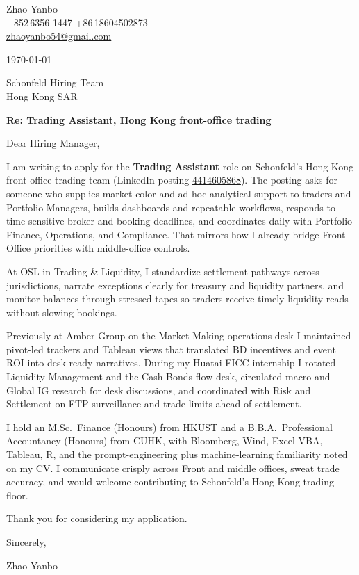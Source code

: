 \documentclass[10pt,a4paper]{article}
\begin{document}
\begin{flushleft}
  Zhao Yanbo\\
  +852\,6356-1447 \;\textbar\; +86\,18604502873\\
  \href{mailto:zhaoyanbo54@gmail.com}{zhaoyanbo54@gmail.com}
\end{flushleft}

\vspace{1em}

\begin{flushright}
  \today
\end{flushright}

\vspace{0.75em}

Schonfeld Hiring Team\\
Hong Kong SAR

\vspace{1em}

\textbf{Re: Trading Assistant, Hong Kong front-office trading}

\vspace{0.75em}

Dear Hiring Manager,

I am writing to apply for the \textbf{Trading Assistant} role on Schonfeld's Hong Kong front-office trading team (LinkedIn posting \href{https://www.linkedin.com/jobs/view/4414605868/}{4414605868}). The posting asks for someone who supplies market color and ad hoc analytical support to traders and Portfolio Managers, builds dashboards and repeatable workflows, responds to time-sensitive broker and booking deadlines, and coordinates daily with Portfolio Finance, Operations, and Compliance. That mirrors how I already bridge Front Office priorities with middle-office controls.

At OSL in Trading \& Liquidity, I standardize settlement pathways across jurisdictions, narrate exceptions clearly for treasury and liquidity partners, and monitor balances through stressed tapes so traders receive timely liquidity reads without slowing bookings.

Previously at Amber Group on the Market Making operations desk I maintained pivot-led trackers and Tableau views that translated BD incentives and event ROI into desk-ready narratives. During my Huatai FICC internship I rotated Liquidity Management and the Cash Bonds flow desk, circulated macro and Global IG research for desk discussions, and coordinated with Risk and Settlement on FTP surveillance and trade limits ahead of settlement.

I hold an M.Sc.\ Finance (Honours) from HKUST and a B.B.A.\ Professional Accountancy (Honours) from CUHK, with Bloomberg, Wind, Excel-VBA, Tableau, R, and the prompt-engineering plus machine-learning familiarity noted on my CV. I communicate crisply across Front and middle offices, sweat trade accuracy, and would welcome contributing to Schonfeld's Hong Kong trading floor.

Thank you for considering my application.

\vspace{1em}

Sincerely,

\vspace{2em}

Zhao Yanbo
\end{document}
